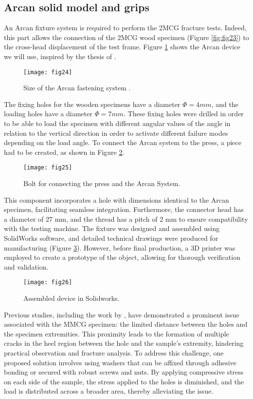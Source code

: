 \subsection{Arcan solid model and grips}

An  Arcan fixture system is required to perform the  2MCG fracture tests. Indeed, this part allows the connection of the 2MCG wood specimen (Figure \ref{fig:fig23}) to the cross-head displacement of the test frame. Figure \ref{fig:fig24} shows the Arcan device we will use, inspired by the thesis of \citep{Odounga2018phd}.


\begin{figure}[htp]
	\centering
	\texttt{[image: fig24]}
	\caption{Size of the Arcan fastening system \citep{Odounga2018phd}.}
	\label{fig:fig24}
\end{figure}

The fixing holes for the wooden specimens have a diameter $\Phi= 4 mm$, and the loading holes have a diameter $\Phi = 7 mm$. These fixing holes were drilled in order to be able to load the specimen with different angular values of the angle in relation to the vertical direction in order to activate different failure modes depending on the load angle. To connect the Arcan system to the press, a piece had to be created, as shown in Figure \ref{fig:fig25}.


\begin{figure}[htp]
	\centering
	\texttt{[image: fig25]}
	\caption{Bolt for connecting the press and the Arcan System.}
	\label{fig:fig25}
\end{figure}

This component incorporates a hole with dimensions identical to the Arcan specimen, facilitating seamless integration. Furthermore, the connector head has a diameter of 27 mm, and the thread has a pitch of 2 mm to ensure compatibility with the testing machine. The fixture was designed and assembled using SolidWorks software, and detailed technical drawings were produced for manufacturing (Figure \ref{fig:fig26}). However, before final production, a 3D printer was employed to create a prototype of the object, allowing for thorough verification and validation.

\begin{figure}[htp]
	\centering
	\texttt{[image: fig26]}
	\caption{Assembled device in Solidworks.}
	\label{fig:fig26}
\end{figure}

Previous studies, including the work by \citep{Odounga2018phd}, have demonstrated a prominent issue associated with the MMCG specimen: the limited distance between the holes and the specimen extremities. This proximity leads to the formation of multiple cracks in the heel region between the hole and the sample's extremity, hindering practical observation and fracture analysis. To address this challenge, one proposed solution involves using washers that can be affixed through adhesive bonding or secured with robust screws and nuts. By applying compressive stress on each side of the sample, the stress applied to the holes is diminished, and the load is distributed across a broader area, thereby alleviating the issue.

